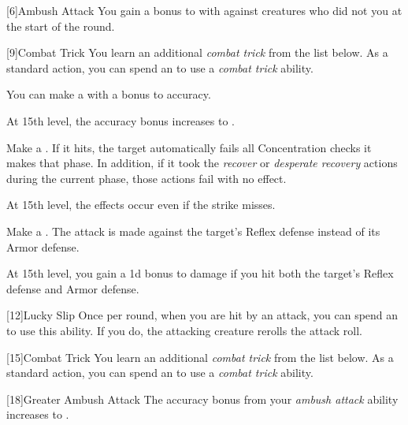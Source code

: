 
        [6]{Ambush Attack}
        You gain a  bonus to  with  against creatures who did not  you at the start of the round.

        [9]{Combat Trick}
        You learn an additional \textit{combat trick} from the list below.
        As a standard action, you can spend an  to use a \textit{combat trick} ability.
        {
             You can make a  with a  bonus to accuracy.

            \par At 15th level, the accuracy bonus increases to .

             Make a .
            If it hits, the target automatically fails all Concentration checks it makes that phase.
            In addition, if it took the \textit{recover} or \textit{desperate recovery} actions during the current phase, those actions fail with no effect.

            \par At 15th level, the effects occur even if the strike misses.

             Make a .
            The attack is made against the target's Reflex defense instead of its Armor defense.

            \par At 15th level, you gain a \plus1d bonus to damage if you hit both the target's Reflex defense and Armor defense.
        }

        [12]{Lucky Slip}
        Once per round, when you are hit by an attack, you can spend an  to use this ability.
        If you do, the attacking creature rerolls the attack roll.

        [15]{Combat Trick}
        You learn an additional \textit{combat trick} from the list below.
        As a standard action, you can spend an  to use a \textit{combat trick} ability.
        {
        }

        [18]{Greater Ambush Attack}
        The accuracy bonus from your \textit{ambush attack} ability increases to .
